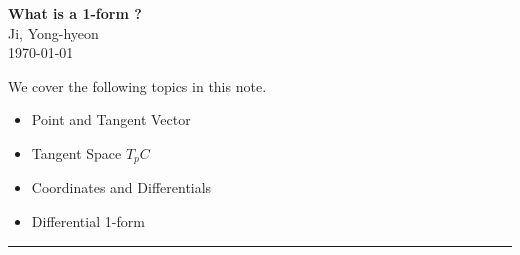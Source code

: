 \documentclass[11pt,openany]{article}
\begin{document}
\begin{center}
	\huge\textbf{What is a 1-form ?}\\ 
	\vspace{0.5em}
	\large{Ji, Yong-hyeon}\\
	\vspace{0.5em}
	\normalsize{\today}\\
\end{center}

\noindent 
We cover the following topics in this note.
\begin{itemize}
	\item Point and Tangent Vector
	\item Tangent Space $T_pC$
	\item Coordinates and Differentials
	\item Differential 1-form
\end{itemize}
\hrule\vspace{12pt}
%		
\end{document}
